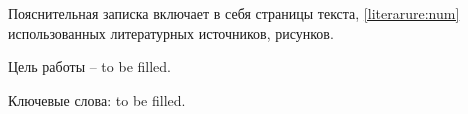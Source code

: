 {
\thispagestyle{empty}
Пояснительная записка включает в себя \pageref{LastPage} страницы текста, \ref{literarure:num} использованных литературных источников,  рисунков. 

Цель работы -- to be filled.

Ключевые слова: to be filled.

\newpage
}